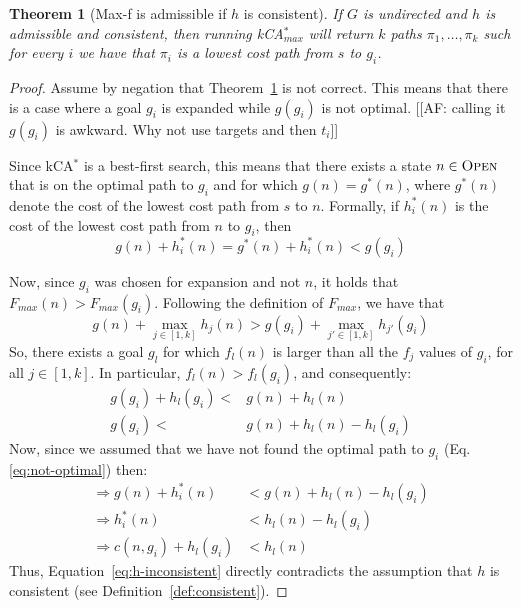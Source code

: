 \documentclass{aicom2e}
\newtheorem{theorem}{Theorem}
\newcommand{\kastar}{kCA$^*$}
\newcommand{\kastarmax}{kCA$^*_{max}$}
\newcommand{\maxf}{Max-f}
\newcommand{\open}{\textsc{Open}}
\begin{document}
\begin{theorem}[\maxf{} is admissible if $h$ is consistent]
If $G$ is undirected and $h$ is admissible and consistent,
then running \kastarmax{} will return $k$ paths $\pi_1,\ldots, \pi_k$ such for every $i$ we have that $\pi_i$ is a lowest cost path from $s$ to $g_i$.
\label{the:max-f}
\end{theorem}
 \begin{proof}
 Assume by negation that Theorem~\ref{the:max-f} is not correct. This means
 that there is a case where a goal $g_i$ is expanded while $g(g_i)$ is not optimal.
[[AF: calling it $g(g_i)$ is awkward. Why not use targets and then $t_i$]]


 Since \kastar{} is a best-first search, this means that there exists a state $n\in \open{}$ that is on the optimal path to $g_i$ and for which $g(n)=g^*(n)$, where $g^*(n)$ denote the cost of the lowest cost path from $s$ to $n$. Formally,
 if $h^*_i(n)$ is the cost of the lowest cost path from $n$ to $g_i$, then
 \begin{equation}
     g(n)+h_i^*(n) = g^*(n)+h_i^*(n) < g(g_i)
    \label{eq:not-optimal}
 \end{equation}

 Now, since $g_i$ was chosen for expansion and not $n$, it holds that $F_{max}(n)  > F_{max}(g_i)$. Following the definition of $F_{max}$, we have that
 \begin{equation}
     g(n)+\max_{j\in [1,k]} h_j(n) > g(g_i) + \max_{j'\in [1,k]} h_{j'}(g_i)
 \end{equation}
 So, there exists a goal $g_l$ for which $f_l(n)$ is larger than
 all the $f_j$ values of $g_i$, for all $j\in [1,k]$. In particular,
 $f_l(n)>f_l(g_i)$, and consequently:
 \begin{align}
     g(g_i)+h_l(g_i) < & g(n)+h_l(n) \\
     g(g_i) < & g(n)+h_l(n) - h_l(g_i)
 \end{align}
Now, since we assumed that we have not found the optimal path to $g_i$ (Eq.~ \ref{eq:not-optimal}) then:
\begin{align}
\Rightarrow g(n)+h^*_i(n)  & < g(n)+h_l(n) - h_l(g_i)\\
\Rightarrow h^*_i(n)  & < h_l(n) - h_l(g_i)\\
\Rightarrow c(n,g_i) + h_l(g_i) & < h_l(n) \label{eq:h-inconsistent}
\end{align}
Thus, Equation~\ref{eq:h-inconsistent} directly contradicts the assumption
that $h$ is consistent (see Definition~\ref{def:consistent}).
\end{proof}
\end{document}
